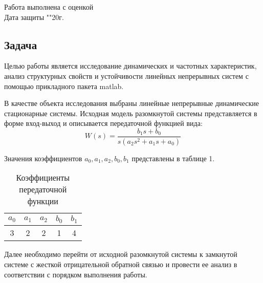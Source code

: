 \documentclass[a4paper, 12pt]{article}
\begin{document}
\begin{titlepage}
	Работа выполнена с оценкой \hspace{1cm} \underline{\hspace{8cm}} \\ 
	\vspace{1cm}
	Дата защиты "\underline{\hspace{0.7cm}}"\hspace{0.2cm}\underline{\hspace{2cm}}\hspace{0.2cm}20\underline{\hspace{0.7cm}}г.
	
\end{titlepage}	

\begin{center}
\section{Задача}
\end{center} \par
Целью работы является исследование динамических и частотных характеристик, анализ структурных свойств и устойчивости линейных непрерывных систем с помощью прикладного пакета matlab. \par
В качестве объекта исследования выбраны линейные непрерывные динамические стационарные системы. Исходная модель разомкнутой системы представляется в форме вход-выход и описывается передаточной функцией вида: 
\begin{equation} 
    W(s) = \frac{b_1s + b_0}{s(a_2s^2 + a_1s + a_0)}
\end{equation} \par
Значения коэффициентов $a_0, a_1, a_2, b_0, b_1$ представлены в таблице 1. \par
\begin{table} [h!]
    \centering
    \begin{threeparttable}
        \caption{Коэффициенты передаточной функции}
        \begin{tabular}{|c|c|c|c|c|}
            \hline
            $a_0$ & $a_1$ & $a_2$ & $b_0$ & $b_1$ \\ \hline
            3 & 2 & 2 & 1 & 4 \\ \hline
        \end{tabular}
    \end{threeparttable}
\end{table}
Далее необходимо перейти от исходной разомкнутой системы к замкнутой системе с жесткой отрицательной обратной связью и провести ее анализ в соответствии с порядком выполнения работы.
\end{document}
